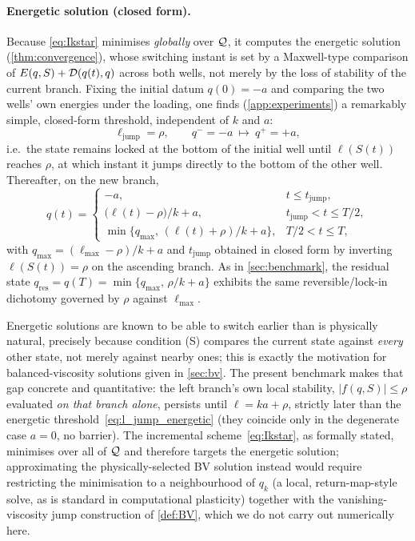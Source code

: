 \paragraph{Energetic solution (closed form).} Because
\eqref{eq:Ikstar} minimises \emph{globally} over $\mathcal{Q}$, it computes the
energetic solution (\cref{thm:convergence}), whose switching instant is
set by a Maxwell-type comparison of $E(q,S)+\mathcal{D}(q(t),q)$ across both
wells, not merely by the loss of stability of the current branch. Fixing
the initial datum $q(0)=-a$ and comparing the two wells' own energies
under the loading, one finds (\cref{app:experiments}) a remarkably
simple, closed-form threshold, independent of $k$ and $a$:
\begin{equation}\label{eq:l_jump_energetic}
  \ell_{\mathrm{jump}} = \rho,
  \qquad
  q^-=-a \ \longmapsto\ q^+=+a,
\end{equation}
i.e.\ the state remains locked at the bottom of the initial well until
$\ell(S(t))$ reaches $\rho$, at which instant it jumps directly to the
bottom of the other well. Thereafter, on the new branch,
\begin{equation}\label{eq:play_exact2}
  q(t)=
  \begin{cases}
    -a, & t\le t_{\mathrm{jump}},\\[2pt]
    \bigl(\ell(t)-\rho\bigr)/k+a, & t_{\mathrm{jump}}<t\le T/2,\\[2pt]
    \min\bigl\{q_{\max},\,(\ell(t)+\rho)/k+a\bigr\}, & T/2<t\le T,
  \end{cases}
\end{equation}
with $q_{\max}=(\ell_{\max}-\rho)/k+a$ and $t_{\mathrm{jump}}$ obtained
in closed form by inverting $\ell(S(t))=\rho$ on the ascending branch.
As in \cref{sec:benchmark}, the residual state
$q_{\mathrm{res}}=q(T)=\min\{q_{\max},\,\rho/k+a\}$ exhibits the same
reversible/lock-in dichotomy governed by $\rho$ against $\ell_{\max}$.

\begin{remark}
\label{rem:energetic_vs_bv}
Energetic solutions are known to be able to switch earlier than is
physically natural, precisely because condition (S) compares the
current state against \emph{every} other state, not merely against
nearby ones; this is exactly the motivation for balanced-viscosity
solutions given in \cref{sec:bv}. The present benchmark makes that
gap concrete and quantitative: the left branch's own local stability,
$|f(q,S)|\le\rho$ evaluated \emph{on that branch alone}, persists until
$\ell = ka+\rho$, strictly later than the energetic
threshold~\eqref{eq:l_jump_energetic} (they coincide only in the
degenerate case $a=0$, no barrier). The incremental
scheme~\eqref{eq:Ikstar}, as formally stated, minimises over all of
$\mathcal{Q}$ and therefore targets the energetic solution; approximating the
physically-selected BV solution instead would require restricting the
minimisation to a neighbourhood of $q_k$ (a local, return-map-style
solve, as is standard in computational plasticity) together with the
vanishing-viscosity jump construction of \cref{def:BV}, which we do
not carry out numerically here.
\end{remark}

